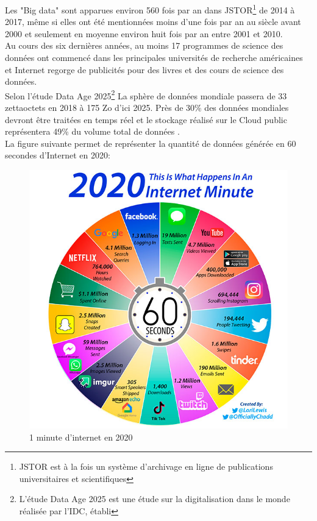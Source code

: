 Les "Big data" sont apparues environ 560 fois par an dans JSTOR\footnote{JSTOR est à la fois un système d'archivage en ligne de publications universitaires et scientifiques } de 2014 à 2017, même si elles ont été mentionnées moins d'une fois par an au siècle avant 2000 et seulement en moyenne environ huit fois par an entre 2001 et 2010.\\

Au cours des six dernières années, au moins 17 programmes de science des données ont commencé dans les principales universités de recherche américaines et Internet regorge de publicités pour des livres et des cours de science des données.\\

Selon l’étude Data Age 2025\footnote{L'étude Data Age 2025 est une étude sur la digitalisation dans le monde réalisée par l'IDC, établi} La sphère de données mondiale passera de 33 zettaoctets en 2018 à 175 Zo d'ici 2025. Près de 30\% des données mondiales devront être traitées en temps réel et le stockage réalisé sur le Cloud public représentera 49\% du volume total de données \cite{dataage2025}.\\

La figure suivante permet de représenter la quantité de données générée en 60 secondes d’Internet en 2020:\\

\begin{figure}[H]
 \centering
 \includegraphics[scale=0.5]{chapitre1/1-MinuteInternet2020.PNG}
 \caption{1 minute d'internet en 2020}
\end{figure} 


